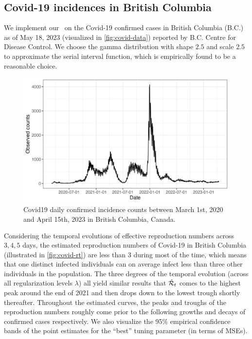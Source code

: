 \subsection{Covid-19 incidences in British Columbia}

We implement our \RtEstim\ on the Covid-19 confirmed cases in British Columbia (B.C.) as of May 18, 2023 (visualized in \autoref{fig:covid-data}) reported by B.C. Centre for Disease Control. We choose the gamma distribution with shape $2.5$ and scale $2.5$ to approximate the serial interval function, which is empirically found to be a reasonable choice. 
\begin{figure}[tb]
    \centering
    \includegraphics[width=0.99\linewidth]{fig/covid_dat.png}
    \caption{Covid19 daily confirmed incidence counts between March 1st, 2020 and April 15th, 2023 in British Columbia, Canada.} 
    \label{fig:covid-data}
\end{figure} 

Considering the temporal evolutions of effective reproduction numbers across $3, 4, 5$ days, the estimated reproduction numbers of Covid-19 in British Columbia (illustrated in \autoref{fig:covid-rt}) are less than $3$ during most of the time, which means that one distinct infected individuals can on average infect less than three other individuals in the population. The three degrees of the temporal evolution (across all regularization levels $\lambda$) all yield similar results that $\hat{\mathcal{R}}_t$ comes to the highest peak around the end of 2021 and then drops down to the lowest trough shortly thereafter. Throughout the estimated curves, the peaks and troughs of the reproduction numbers roughly come prior to the following growths and decays of confirmed cases respectively.
We also visualize the 95\% empirical confidence bands of the point estimates for the ``best'' tuning parameter (in terms of MSEs). 

